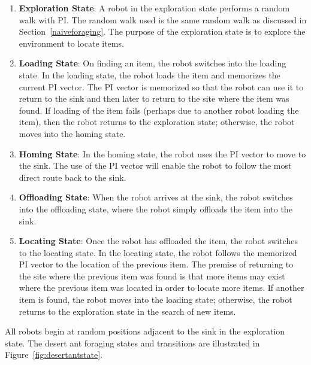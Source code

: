 \begin{enumerate}
	\item\textbf{Exploration State}: A robot in the exploration state performs a random walk with PI. The random walk used is the same random walk as discussed in Section~\ref{naiveforaging}. The purpose of the exploration state is to explore the environment to locate items. 
	\item\textbf{Loading State}: On finding an item, the robot switches into the loading state. In the loading state, the robot loads the item and memorizes the current PI vector. The PI vector is memorized so that the robot can use it to return to the sink and then later to return to the site where the item was found. If loading of the item fails (perhaps due to another robot loading the item), then the robot returns to the exploration state; otherwise, the robot moves into the homing state.
	\item\textbf{Homing State}: In the homing state, the robot uses the PI vector to move to the sink. The use of the PI vector will enable the robot to follow the most direct route back to the sink.
	\item\textbf{Offloading State}: When the robot arrives at the sink, the robot switches into the offloading state, where the robot simply offloads the item into the sink. 
	\item\textbf{Locating State}: Once the robot has offloaded the item, the robot switches to the locating state. In the locating state, the robot follows the memorized PI vector to the location of the previous item. The premise of returning to the site where the previous item was found is that more items may exist where the previous item was located in order to locate more items. If another item is found, the robot moves into the loading state; otherwise, the robot returns to the exploration state in the search of new items. 
\end{enumerate}

All robots begin at random positions adjacent to the sink in the exploration state. The desert ant foraging states and transitions are illustrated in Figure~\ref{fig:desertantstate}.

